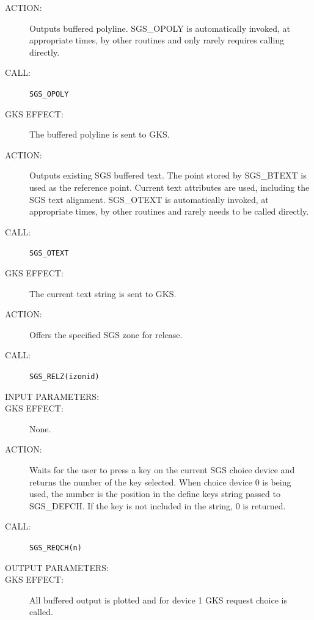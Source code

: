 \documentclass[11pt]{article}
\newcommand{\htmlref}[2]{#1}
\begin{document}
\begin{description}
\item [ACTION:]
Outputs buffered polyline.
SGS\_OPOLY is automatically invoked, at appropriate times, by other routines and
only rarely requires calling directly.
\item [CALL:]
{\tt SGS\_OPOLY}
\item [GKS EFFECT:]
The buffered polyline is sent to GKS.
\end{description}
\goodbreak

\begin{description}
\item [ACTION:]
Outputs existing SGS buffered text.
The point stored by \htmlref{SGS\_BTEXT}{SGS_BTEXT}
is used as the reference point.
Current text attributes are used, including the SGS text alignment.
SGS\_OTEXT is automatically invoked, at appropriate times, by other routines and
rarely needs to be called directly.
\item [CALL:]
{\tt SGS\_OTEXT}
\item [GKS EFFECT:]
The current text string is sent to GKS.
\end{description}
\goodbreak

\begin{description}
\item [ACTION:]
Offers the specified SGS zone for release.
\item [CALL:]
{\tt SGS\_RELZ(izonid)}
\item [INPUT PARAMETERS:]
\begin{params}
\end{params}
\item [GKS EFFECT:]
None.
\end{description}
\goodbreak

\begin{description}
\item [ACTION:]
Waits for the user to press a key on the current SGS choice device
and returns the number of the key selected.
When choice device 0 is being used, the number is the position in the define
keys string passed to \htmlref{SGS\_DEFCH}{SGS_DEFCH}.
If the key is not included in the string, 0 is returned.
\item [CALL:]
{\tt SGS\_REQCH(n)}
\item [OUTPUT PARAMETERS:]
\begin{params}
\end{params}
\item [GKS EFFECT:]
All buffered output is plotted and for device 1 GKS request choice is called.
\end{description}
\goodbreak
\end{document}
